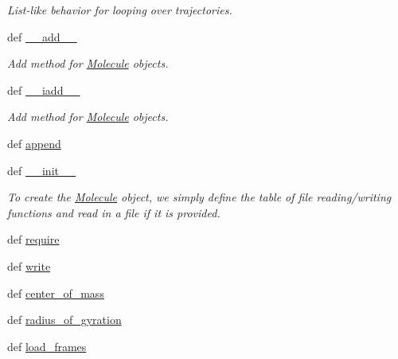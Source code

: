 \begin{DoxyCompactItemize}
\begin{DoxyCompactList}\small\item\em List-\/like behavior for looping over trajectories. \end{DoxyCompactList}\item 
def \hyperlink{classforcebalance_1_1molecule_1_1Molecule_a3e82ae8215555b543f1e5800b718c409}{\-\_\-\-\_\-add\-\_\-\-\_\-}
\begin{DoxyCompactList}\small\item\em Add method for \hyperlink{classforcebalance_1_1molecule_1_1Molecule}{Molecule} objects. \end{DoxyCompactList}\item 
def \hyperlink{classforcebalance_1_1molecule_1_1Molecule_ae1bcdf1cc78a6cc165de80bacc7b69c5}{\-\_\-\-\_\-iadd\-\_\-\-\_\-}
\begin{DoxyCompactList}\small\item\em Add method for \hyperlink{classforcebalance_1_1molecule_1_1Molecule}{Molecule} objects. \end{DoxyCompactList}\item 
def \hyperlink{classforcebalance_1_1molecule_1_1Molecule_a77417ff99b19f6d0b7c6f527e83fa7f1}{append}
\item 
def \hyperlink{classforcebalance_1_1molecule_1_1Molecule_a3f8233f4e9911d7af0f17ca66c16ff92}{\-\_\-\-\_\-init\-\_\-\-\_\-}
\begin{DoxyCompactList}\small\item\em To create the \hyperlink{classforcebalance_1_1molecule_1_1Molecule}{Molecule} object, we simply define the table of file reading/writing functions and read in a file if it is provided. \end{DoxyCompactList}\item 
def \hyperlink{classforcebalance_1_1molecule_1_1Molecule_a80851250d8e749bea882d5aa4bcfcdd1}{require}
\item 
def \hyperlink{classforcebalance_1_1molecule_1_1Molecule_a4ecfdf28aacff9c081dd50cd4ac84f89}{write}
\item 
def \hyperlink{classforcebalance_1_1molecule_1_1Molecule_a6aa22586a5590f63ea20e269e3f195a5}{center\-\_\-of\-\_\-mass}
\item 
def \hyperlink{classforcebalance_1_1molecule_1_1Molecule_a02ff6f6642ed47c3b1fa3bb00191c32a}{radius\-\_\-of\-\_\-gyration}
\item 
def \hyperlink{classforcebalance_1_1molecule_1_1Molecule_a68e276a95910d534fa2e937abbc60e1c}{load\-\_\-frames}
\item 

\end{DoxyCompactItemize}

